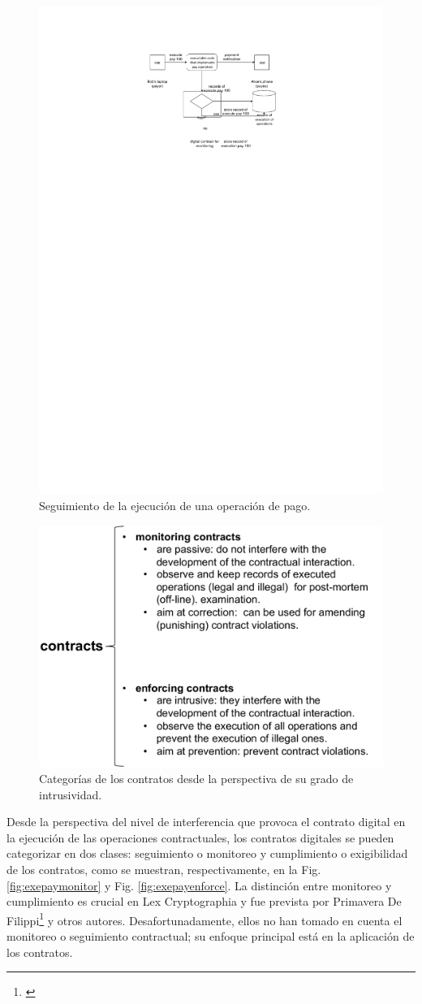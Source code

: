 \documentclass[12pt]{report} %
\begin{document}
\begin{figure}
\centering
\includegraphics[width=0.65\columnwidth]{imagenes/Seguimientodelcontrato.pdf}
\caption{Seguimiento de la ejecución de una operación de pago.}
\label{fig:ejecucióncontrator}
\end{figure}


\begin{figure}
\centering
\includegraphics[width=0.55\columnwidth]{figures/contcatemonienforce.pdf}
\caption{Categorías de los contratos desde la perspectiva de su grado de intrusividad.}
\label{fig:contcatemonienforce}
\end{figure}

Desde la perspectiva del nivel de interferencia que provoca el contrato digital en la ejecución de las operaciones contractuales, los contratos digitales se pueden categorizar en dos clases: seguimiento o monitoreo y cumplimiento o exigibilidad de los contratos, como se muestran, respectivamente, en la Fig. \ref{fig:exepaymonitor} y Fig. \ref{fig:exepayenforce}. La distinción entre monitoreo y cumplimiento es crucial en Lex Cryptographia y fue prevista por Primavera De Filippi\footnote{\cite{PrimaveraAaron2018}} y otros autores. Desafortunadamente, ellos no han tomado en cuenta el monitoreo o seguimiento contractual; su enfoque principal está en la aplicación de los contratos.
\end{document}
